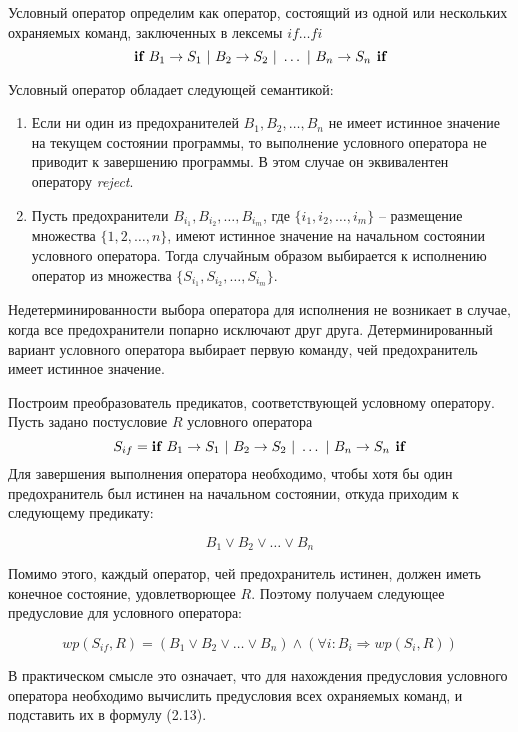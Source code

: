 Условный оператор определим как оператор, состоящий из одной или нескольких охраняемых команд, 
заключенных в лексемы $if \ldots fi$
\begin{equation}
\textbf{if } B_1 \rightarrow S_1 \text{ | } B_2 \rightarrow S_2 \text{ | } \ldots \text{ | } B_n \rightarrow S_n \textbf{ if}
\end{equation}

Условный оператор обладает следующей семантикой:
\begin{enumerate}
	\item Если ни один из предохранителей $B_1, B_2, \ldots, B_n$ не имеет истинное значение на 
	текущем состоянии программы, то выполнение условного оператора не приводит к завершению программы.
	В этом случае он эквивалентен оператору \textit{reject}.
	\item Пусть предохранители $B_{i_1}, B_{i_2},\ldots, B_{i_m}$, где $\{i_1, i_2, \ldots, i_m\}$ -- размещение 
	множества $\{1, 2, \ldots, n\}$, имеют истинное значение на начальном состоянии условного оператора.
	Тогда случайным образом выбирается к исполнению оператор из множества $\{S_{i_1}, S_{i_2}, \ldots, S_{i_m}\}$.
\end{enumerate}

Недетерминированности выбора оператора для исполнения не возникает в случае,
когда все предохранители попарно исключают друг друга.
Детерминированный вариант условного оператора выбирает первую команду, чей предохранитель имеет истинное значение.

Построим преобразователь предикатов, соответствующей условному оператору. Пусть задано постусловие $R$ условного 
оператора 
\begin{equation}
	S_{if} = \textbf{if } B_1 \rightarrow S_1 \text{ | } B_2 \rightarrow S_2 \text{ | } \ldots \text{ | } B_n \rightarrow S_n \textbf{ if}
\end{equation}
Для завершения выполнения оператора необходимо, чтобы хотя бы один предохранитель был истинен на начальном состоянии, откуда приходим к следующему предикату:

\begin{equation}
	B_1 \vee B_2 \vee \ldots \vee B_n
\end{equation}

Помимо этого, каждый оператор, чей предохранитель истинен, должен иметь конечное состояние, удовлетворющее $R$. Поэтому
получаем следующее предусловие для условного оператора:

\begin{equation}
	wp(S_{if}, R) = (B_1 \vee B_2 \vee \ldots \vee B_n) \wedge (\forall i: B_i \Rightarrow wp(S_i, R))
\end{equation}

В практическом смысле это означает, что для нахождения предусловия условного оператора необходимо вычислить предусловия
всех охраняемых команд, и подставить их в формулу (2.13).

